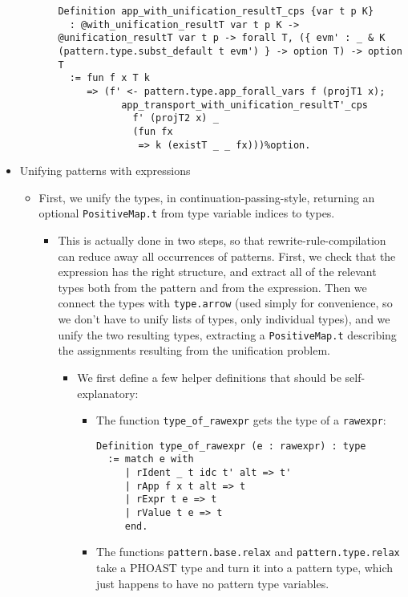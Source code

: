 \documentclass[
]{article}
\providecommand{\tightlist}{%
  \setlength{\itemsep}{0pt}\setlength{\parskip}{0pt}}
\begin{document}
\begin{itemize}
\begin{itemize}
\begin{itemize}
\begin{verbatim}
Definition app_with_unification_resultT_cps {var t p K}
  : @with_unification_resultT var t p K -> @unification_resultT var t p -> forall T, ({ evm' : _ & K (pattern.type.subst_default t evm') } -> option T) -> option T
  := fun f x T k
     => (f' <- pattern.type.app_forall_vars f (projT1 x);
           app_transport_with_unification_resultT'_cps
             f' (projT2 x) _
             (fun fx
              => k (existT _ _ fx)))%option.
\end{verbatim}
    \end{itemize}
  \end{itemize}
\item
  Unifying patterns with expressions

  \begin{itemize}
  \tightlist
  \item
    First, we unify the types, in continuation-passing-style, returning
    an optional \texttt{PositiveMap.t} from type variable indices to
    types.

    \begin{itemize}
    \tightlist
    \item
      This is actually done in two steps, so that
      rewrite-rule-compilation can reduce away all occurrences of
      patterns. First, we check that the expression has the right
      structure, and extract all of the relevant types both from the
      pattern and from the expression. Then we connect the types with
      \texttt{type.arrow} (used simply for convenience, so we don't have
      to unify lists of types, only individual types), and we unify the
      two resulting types, extracting a \texttt{PositiveMap.t}
      describing the assignments resulting from the unification problem.

      \begin{itemize}
      \item
        We first define a few helper definitions that should be
        self-explanatory:

        \begin{itemize}
        \item
          The function \texttt{type\_of\_rawexpr} gets the type of a
          \texttt{rawexpr}:

\begin{verbatim}
Definition type_of_rawexpr (e : rawexpr) : type
  := match e with
     | rIdent _ t idc t' alt => t'
     | rApp f x t alt => t
     | rExpr t e => t
     | rValue t e => t
     end.
\end{verbatim}
        \item
          The functions \texttt{pattern.base.relax} and
          \texttt{pattern.type.relax} take a PHOAST type and turn it
          into a pattern type, which just happens to have no pattern
          type variables.


\end{itemize}
\end{itemize}
\end{itemize}
\end{itemize}
\end{itemize}
\end{document}
